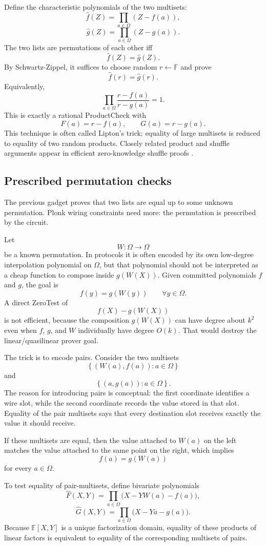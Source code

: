 \documentclass[11pt]{article}
\newcommand{\F}{\mathbb{F}}
\newcommand{\set}[1]{\left\{#1\right\}}
\begin{document}
Define the characteristic polynomials of the two multisets:
\[
    \widehat f(Z)=\prod_{a\in\Omega}(Z-f(a)),
\]
\[
    \widehat g(Z)=\prod_{a\in\Omega}(Z-g(a)).
\]
The two lists are permutations of each other iff
\[
    \widehat f(Z)=\widehat g(Z).
\]
By Schwartz-Zippel, it suffices to choose random $r\leftarrow\F$ and prove
\[
    \widehat f(r)=\widehat g(r).
\]
Equivalently,
\[
    \prod_{a\in\Omega}\frac{r-f(a)}{r-g(a)}=1.
\]
This is exactly a rational ProductCheck with
\[
    F(a)=r-f(a),
    \qquad
    G(a)=r-g(a).
\]
This technique is often called Lipton's trick: equality of large multisets is reduced to equality of two random products. Closely related product and shuffle arguments appear in efficient zero-knowledge shuffle proofs \cite{BayerGroth2012}.

\subsection{Prescribed permutation checks}

The previous gadget proves that two lists are equal up to some unknown permutation. Plonk wiring constraints need more: the permutation is prescribed by the circuit.

Let
\[
    W:\Omega\to\Omega
\]
be a known permutation. In protocols it is often encoded by its own low-degree interpolation polynomial on $\Omega$, but that polynomial should not be interpreted as a cheap function to compose inside $g(W(X))$. Given committed polynomials $f$ and $g$, the goal is
\[
    f(y)=g(W(y))\qquad\forall y\in\Omega.
\]
A direct ZeroTest of
\[
    f(X)-g(W(X))
\]
is not efficient, because the composition $g(W(X))$ can have degree about $k^2$ even when $f$, $g$, and $W$ individually have degree $O(k)$. That would destroy the linear/quasilinear prover goal.

The trick is to encode pairs. Consider the two multisets
\[
    \set{(W(a),f(a)):a\in\Omega}
\]
and
\[
    \set{(a,g(a)):a\in\Omega}.
\]
The reason for introducing pairs is conceptual: the first coordinate identifies a wire slot, while the second coordinate records the value stored in that slot. Equality of the pair multisets says that every destination slot receives exactly the value it should receive.

If these multisets are equal, then the value attached to $W(a)$ on the left matches the value attached to the same point on the right, which implies
\[
    f(a)=g(W(a))
\]
for every $a\in\Omega$.

To test equality of pair-multisets, define bivariate polynomials
\[
    \widehat F(X,Y)=\prod_{a\in\Omega}\bigl(X-YW(a)-f(a)\bigr),
\]
\[
    \widehat G(X,Y)=\prod_{a\in\Omega}\bigl(X-Ya-g(a)\bigr).
\]
Because $\F[X,Y]$ is a unique factorization domain, equality of these products of linear factors is equivalent to equality of the corresponding multisets of pairs.
\end{document}
